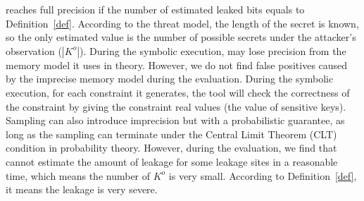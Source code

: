 \tool{} reaches full precision if the number of estimated leaked bits 
equals to Definition~\ref{def}. According to the threat model, the 
length of the secret is known, so the only estimated value is the number
of possible secrets under the attacker's observation ($|K^o|$). 
During the symbolic execution, \tool{} may lose precision from the 
memory model it uses in theory. However, we do not find false positives 
caused by the imprecise memory model during the evaluation. 
During the symbolic execution, for each constraint it generates,
the tool will check the correctness of the constraint by giving 
the constraint real values (the value of sensitive keys). Sampling 
can also introduce imprecision but with a probabilistic guarantee, 
as long as the sampling can terminate under the Central Limit Theorem (CLT) condition in probability theory. 
However, during the evaluation, we find that \tool{} cannot estimate 
the amount of leakage for some leakage sites in a reasonable time, 
which means the number of $K^o$ is very small. According to Definition~\ref{def}, 
it means the leakage is very severe.


